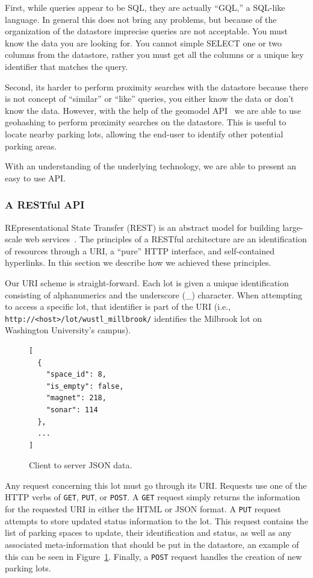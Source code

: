 \documentclass{acm_proc}
\begin{document}
First, while queries appear to be SQL, they are actually ``GQL,'' a
SQL-like language.
In general this does not bring any problems, but because of the
organization of the datastore imprecise queries are not acceptable.
You must know the data you are looking for.
You cannot simple SELECT one or two columns from the datastore, rather you
must get all the columns or a unique key identifier that matches the query.

Second, its harder to perform proximity searches with the datastore because
there is not concept of ``similar'' or ``like'' queries, you either know
the data or don't know the data.
However, with the help of the geomodel API~\cite{geomodel} we are able to
use geohashing to perform proximity searches on the datastore.
This is useful to locate nearby parking lots, allowing the end-user to
identify other potential parking areas.

With an understanding of the underlying technology, we are able to present
an easy to use API.

\subsubsection{A RESTful API}

REpresentational State Transfer (REST) is an abstract model for building
large-scale web services~\cite{pautasso:restful}.
The principles of a RESTful architecture are an identification of resources
through a URI, a ``pure'' HTTP interface, and self-contained hyperlinks.
In this section we describe how we achieved these principles.

Our URI scheme is straight-forward.
Each lot is given a unique identification consisting of alphanumerics and
the underscore (\_) character.
When attempting to access a specific lot, that identifier is part of the
URI (i.e.,
\texttt{http://<host>/lot/wustl\_millbrook/}
identifies the Milbrook lot on Washington University's campus).

\begin{figure}
    \begin{verbatim}
[
  {
    "space_id": 8,
    "is_empty": false,
    "magnet": 218,
    "sonar": 114
  },
  ...
]
\end{verbatim}
	\caption{Client to server JSON data.}
	\label{fig:clientserverjson}
\end{figure}

Any request concerning this lot must go through its URI.
Requests use one of the HTTP verbs of \texttt{GET}, \texttt{PUT}, or
\texttt{POST}.
A \texttt{GET} request simply returns the information for the requested URI
in either the HTML or JSON format.
A \texttt{PUT} request attempts to store updated status information to the
lot.
This request contains the list of parking spaces to update, their
identification and status, as well as any associated meta-information that
should be put in the datastore, an example of this can be seen in
Figure~\ref{fig:clientserverjson}.
Finally, a \texttt{POST} request handles the creation of new parking lots.
\end{document}
